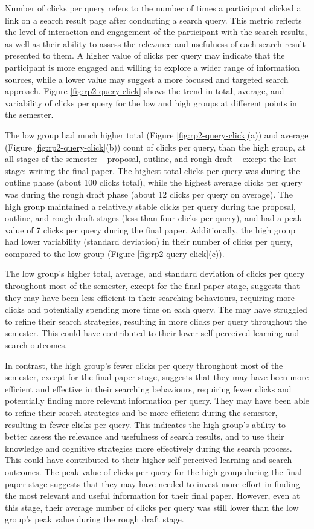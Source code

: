 \documentclass[letterpaper, nobind]{templates/ociamthesis}
\begin{document}
Number of clicks per query refers to the number of times a participant clicked a link on a search result page after conducting a search query.
This metric reflects the level of interaction and engagement of the participant with the search results, as well as their ability to assess the relevance and usefulness of each search result presented to them.
A higher value of clicks per query may indicate that the participant is more engaged and willing to explore a wider range of information sources, while a lower value may suggest a more focused and targeted search approach.
Figure \ref{fig:rp2-query-click} shows the trend in total, average, and variability of clicks per query for the low and high groups at different points in the semester.

The low group had much higher total (Figure \ref{fig:rp2-query-click}(a)) and average (Figure \ref{fig:rp2-query-click}(b)) count of clicks per query, than the high group, at all stages of the semester -- proposal, outline, and rough draft -- except the last stage: writing the final paper.
The highest total clicks per query was during the outline phase (about 100 clicks total), while the highest average clicks per query was during the rough draft phase (about 12 clicks per query on average).
The high group maintained a relatively stable clicks per query during the proposal, outline, and rough draft stages (less than four clicks per query), and had a peak value of 7 clicks per query during the final paper.
Additionally, the high group had lower variability (standard deviation) in their number of clicks per query, compared to the low group (Figure \ref{fig:rp2-query-click}(c)).

The low group's higher total, average, and standard deviation of clicks per query throughout most of the semester, except for the final paper stage, suggests that they may have been less efficient in their searching behaviours, requiring more clicks and potentially spending more time on each query.
The may have struggled to refine their search strategies, resulting in more clicks per query throughout the semester.
This could have contributed to their lower self-perceived learning and search outcomes.

In contrast, the high group's fewer clicks per query throughout most of the semester, except for the final paper stage, suggests that they may have been more efficient and effective in their searching behaviours, requiring fewer clicks and potentially finding more relevant information per query.
They may have been able to refine their search strategies and be more efficient during the semester, resulting in fewer clicks per query.
This indicates the high group's ability to better assess the relevance and usefulness of search results, and to use their knowledge and cognitive strategies more effectively during the search process.
This could have contributed to their higher self-perceived learning and search outcomes.
The peak value of clicks per query for the high group during the final paper stage suggests that they may have needed to invest more effort in finding the most relevant and useful information for their final paper.
However, even at this stage, their average number of clicks per query was still lower than the low group's peak value during the rough draft stage.
\end{document}
